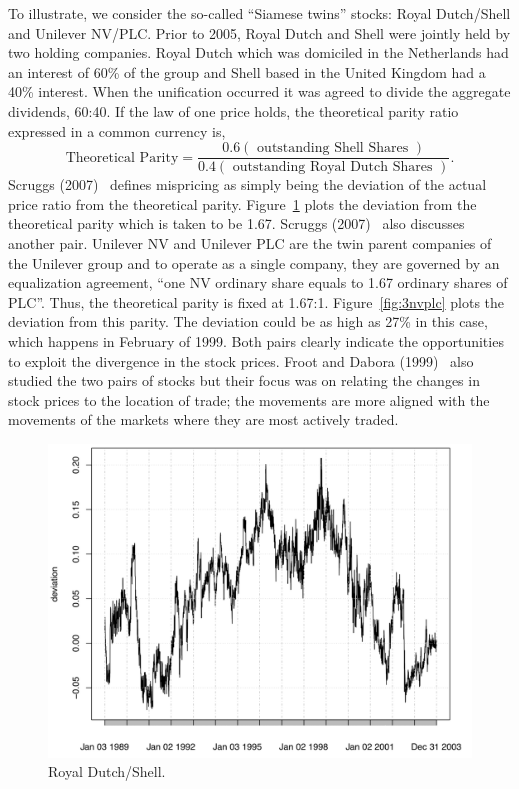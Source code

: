 To illustrate, we consider the so-called ``Siamese twins'' stocks: Royal Dutch/Shell and Unilever NV/PLC. Prior to 2005, Royal Dutch and Shell were jointly held by two holding companies. Royal Dutch which was domiciled in the Netherlands had an interest of 60\% of the group and Shell based in the United Kingdom had a 40\% interest. When the unification occurred it was agreed to divide the aggregate dividends, 60:40. If the law of one price holds, the theoretical parity ratio expressed in a common currency is,
	\[
	\text{Theoretical Parity}= \frac{0.6 (\text{ outstanding Shell Shares })}{0.4 (\text{ outstanding Royal Dutch Shares })}.
	\]
Scruggs (2007)~\cite{scruggs} defines mispricing as simply being the deviation of the actual price ratio from the theoretical parity. Figure~\ref{fig:3royal} plots the deviation from the theoretical parity which is taken to be 1.67. Scruggs (2007)~\cite{scruggs} also discusses another pair. Unilever NV and Unilever PLC are the twin parent companies of the Unilever group and to operate as a single company, they are governed by an equalization agreement, ``one NV ordinary share equals to 1.67 ordinary shares of PLC''. Thus, the theoretical parity is fixed at 1.67:1. Figure~\ref{fig:3nvplc} plots the deviation from this parity. The deviation could be as high as 27\% in this case, which happens in February of 1999. Both pairs clearly indicate the opportunities to exploit the divergence in the stock prices. Froot and Dabora (1999)~\cite{froot1999stock} also studied the two pairs of stocks but their focus was on relating the changes in stock prices to the location of trade; the movements are more aligned with the movements of the markets where they are most actively traded.

	\begin{figure}[!ht]
	\centering
	\includegraphics[width=\textwidth]{chapters/chapter_stat_ts/figures/471.png}
	\caption{Royal Dutch/Shell. \label{fig:3royal}}
	\end{figure}
	
